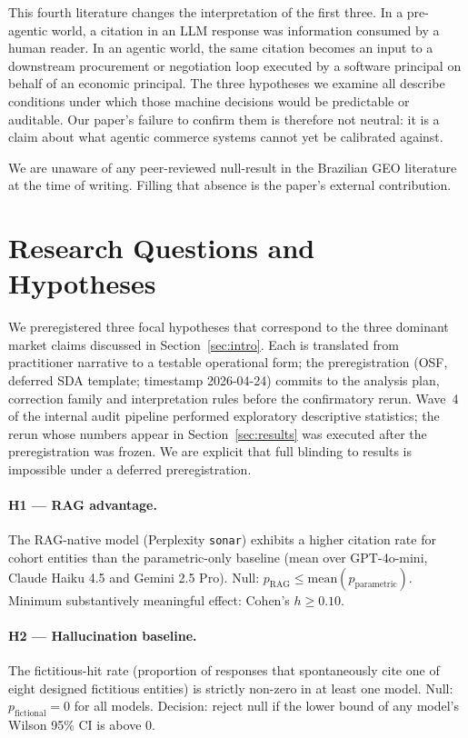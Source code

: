 \documentclass[preprint,12pt,authoryear]{elsarticle}
\begin{document}
This fourth literature changes the interpretation of the first three. In a pre-agentic world, a citation in an LLM response was information consumed by a human reader. In an agentic world, the same citation becomes an input to a downstream procurement or negotiation loop executed by a software principal on behalf of an economic principal. The three hypotheses we examine all describe conditions under which those machine decisions would be predictable or auditable. Our paper's failure to confirm them is therefore not neutral: it is a claim about what agentic commerce systems cannot yet be calibrated against.

We are unaware of any peer-reviewed null-result in the Brazilian GEO literature at the time of writing. Filling that absence is the paper's external contribution.

\section{Research Questions and Hypotheses}\label{sec:rq}

We preregistered three focal hypotheses that correspond to the three dominant market claims discussed in Section~\ref{sec:intro}. Each is translated from practitioner narrative to a testable operational form; the preregistration (OSF, deferred SDA template; timestamp 2026-04-24) commits to the analysis plan, correction family and interpretation rules before the confirmatory rerun. Wave~4 of the internal audit pipeline performed exploratory descriptive statistics; the rerun whose numbers appear in Section~\ref{sec:results} was executed after the preregistration was frozen. We are explicit that full blinding to results is impossible under a deferred preregistration.

\paragraph{H1 --- RAG advantage.} The RAG-native model (Perplexity \texttt{sonar}) exhibits a higher citation rate for cohort entities than the parametric-only baseline (mean over GPT-4o-mini, Claude Haiku 4.5 and Gemini 2.5 Pro). Null: $p_{\text{RAG}} \leq \text{mean}(p_{\text{parametric}})$. Minimum substantively meaningful effect: Cohen's $h\geq 0.10$.

\paragraph{H2 --- Hallucination baseline.} The fictitious-hit rate (proportion of responses that spontaneously cite one of eight designed fictitious entities) is strictly non-zero in at least one model. Null: $p_{\text{fictional}}=0$ for all models. Decision: reject null if the lower bound of any model's Wilson 95\% CI is above 0.
\end{document}
